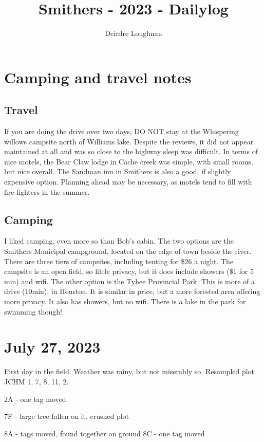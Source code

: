 \documentclass{article}\usepackage[]{graphicx}\usepackage[]{color}
\title{Smithers - 2023 - Dailylog}
\author{Deirdre Loughnan}
\begin{document}
\maketitle
\section{Camping and travel notes}

\subsection{Travel}

If you are doing the drive over two days, DO NOT stay at the Whispering willows campsite north of Williams lake. Despite the reviews, it did not appear maintained at all and was so close to the highway sleep was difficult. In terms of nice motels, the Bear Claw lodge in Cache creek was simple, with small rooms, but nice overall. The Sandman inn in Smithers is also a good, if slightly expensive option. Planning ahead may be necessary, as motels tend to fill with fire fighters in the summer. 

\subsection{Camping}

I liked camping, even more so than Bob's cabin. The two options are the Smithers Municipal campground, located on the edge of town beside the river. There are three tiers of campsites, including tenting for \$26 a night. The campsite is an open field, so little privacy, but it does include showers (\$1 for 5 min) and wifi. The other option is the Tyhee Provincial Park. This is more of a drive (10min), in Houston. It is similar in price, but a more forested area offering more privacy. It also has showers, but no wifi. There is a lake in the park for swimming though!

\section{July 27, 2023}

First day in the field. Weather was rainy, but not miserably so. Resampled plot JCHM 1, 7, 8, 11, 2. 

2A - one tag moved

7F - large tree fallen on it, crushed plot

8A -  tags moved, found together on ground
8C - one tag moved
\end{document}
